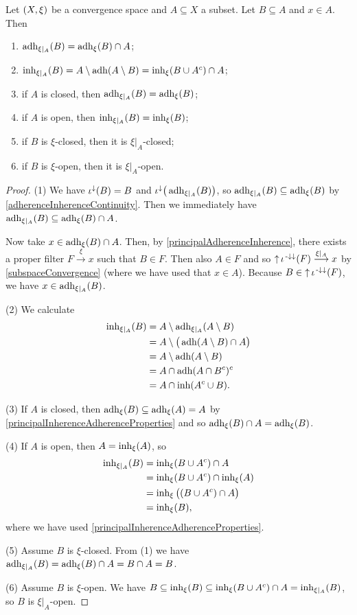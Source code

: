 \begin{proposition} \label{subspaceAdherence}
Let $\sSet{X,\xi}$ be a convergence space and $A\subseteq X$ a subset. Let $B\subseteq A$ and $x\in A$. Then
\begin{enumerate}
\item $\operatorname{adh}_{\xi|_A}(B) = \operatorname{adh}_\xi(B) \cap A$;
\item $\operatorname{inh}_{\xi|_A}(B) = A\setminus \operatorname{adh}(A\setminus B) = \operatorname{inh}_\xi(B\cup A^c) \cap A$;
\item if $A$ is closed, then $\operatorname{adh}_{\xi|_A}(B) = \operatorname{adh}_\xi(B)$;
\item if $A$ is open, then $\operatorname{inh}_{\xi|_A}(B) = \operatorname{inh}_\xi(B)$;
\item if $B$ is $\xi$-closed, then it is $\xi|_A$-closed;
\item if $B$ is $\xi$-open, then it is $\xi|_A$-open.
\end{enumerate}
\end{proposition}
\begin{proof}
(1) We have $\iota^\downarrow(B) = B$ and $\iota^\downarrow\big(\operatorname{adh}_{\xi|_A}(B)\big)$, so $\operatorname{adh}_{\xi|_A}(B) \subseteq \operatorname{adh}_\xi(B)$ by \ref{adherenceInherenceContinuity}. Then we immediately have $\operatorname{adh}_{\xi|_A}(B) \subseteq \operatorname{adh}_\xi(B) \cap A$.

Now take $x\in \operatorname{adh}_\xi(B) \cap A$. Then, by \ref{principalAdherenceInherence}, there exists a proper filter $F\overset{\xi}{\longrightarrow} x$ such that $B\in F$. Then also $A\in F$ and so $\operatorname{\uparrow} \iota^{{\text{\hspace{0.15em}-}\downarrow}\downarrow}(F)\overset{\xi|_A}{\longrightarrow} x$ by \ref{subspaceConvergence} (where we have used that $x\in A$). Because $B\in \operatorname{\uparrow} \iota^{{\text{\hspace{0.15em}-}\downarrow}\downarrow}(F)$, we have $x\in \operatorname{adh}_{\xi|_A}(B)$.

(2) We calculate
\begin{align*}
\operatorname{inh}_{\xi|_A}(B) &= A\setminus \operatorname{adh}_{\xi|_A}(A\setminus B) \\
&= A\setminus \big(\operatorname{adh}(A\setminus B)\cap A\big) \\
&= A\setminus \operatorname{adh}(A\setminus B) \\
&= A\cap \operatorname{adh}(A\cap B^c)^c \\
&= A\cap \operatorname{inh}(A^c\cup B).
\end{align*}

(3) If $A$ is closed, then $\operatorname{adh}_\xi(B)\subseteq \operatorname{adh}_\xi(A) = A$ by \ref{principalInherenceAdherenceProperties} and so $\operatorname{adh}_\xi(B)\cap A = \operatorname{adh}_\xi(B)$.

(4) If $A$ is open, then $A = \operatorname{inh}_\xi(A)$, so
\begin{align*}
\operatorname{inh}_{\xi|_A}(B) &= \operatorname{inh}_\xi(B\cup A^c) \cap A \\
&= \operatorname{inh}_\xi(B\cup A^c) \cap \operatorname{inh}_\xi(A) \\
&= \operatorname{inh}_\xi\big((B\cup A^c)\cap A\big) \\
&= \operatorname{inh}_\xi(B),
\end{align*}
where we have used \ref{principalInherenceAdherenceProperties}.

(5) Assume $B$ is $\xi$-closed. From (1) we have $\operatorname{adh}_{\xi|_A}(B) = \operatorname{adh}_\xi(B) \cap A = B\cap A = B$.

(6) Assume $B$ is $\xi$-open. We have $B \subseteq \operatorname{inh}_\xi(B) \subseteq \operatorname{inh}_\xi(B\cup A^c) \cap A = \operatorname{inh}_{\xi|_A}(B)$, so $B$ is $\xi|_A$-open.
\end{proof}

